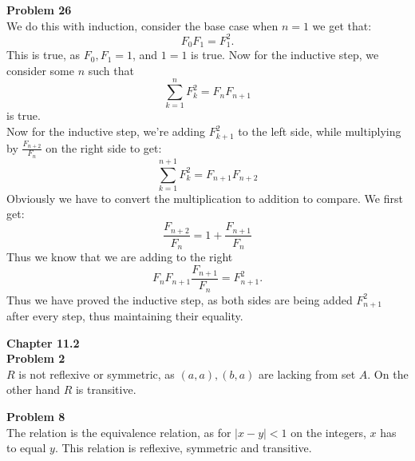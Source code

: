 \documentclass[12pt]{article}
\begin{document}
\noindent
\textbf{Problem 26}\\
We do this with induction, consider the base case when $n=1$ we get that:  \[
F_0F_1 = F_1^2
.\] 
This is true, as $F_0, F_1 = 1$, and $1 = 1$ is true. Now for the inductive step, 
we consider some $n$ such that 
$$\sum_{k=1}^{n}F^2_k = F_nF_{n+1}$$
is true. \\
Now for the inductive step, we're adding $F_{k+1}^2$ to the left side, while multiplying by 
$\frac{F_{n+2}}{F_n}$ on the right side to get:
$$\sum_{k=1}^{n+1}F^2_k = F_{n+1}F_{n+2}$$
Obviously we have to convert the multiplication to addition to compare. We first get:
$$\frac{F_{n+2}}{F_n} = 1 + \frac{F_{n+1}}{F_n}$$
Thus we know that we are adding to the right
\[
	F_nF_{n+1}\frac{F_{n+1}}{F_n} = F_{n+1}^2
.\] Thus we have proved the inductive step, as both sides are being added $F^2_{n+1}$
after every step, thus maintaining their equality.

\noindent
\textbf{Chapter 11.2}\\

\noindent
\textbf{Problem 2}\\
$R$ is not reflexive or symmetric, as $(a,a),(b,a)$ are lacking from set $A$. On the other hand
$R$ is transitive.

\noindent
\textbf{Problem 8}\\
The relation is the equivalence relation, as for $|x-y| < 1$ on the integers, 
$x$ has to equal $y$. This relation is reflexive, symmetric and transitive. \\
\end{document}
